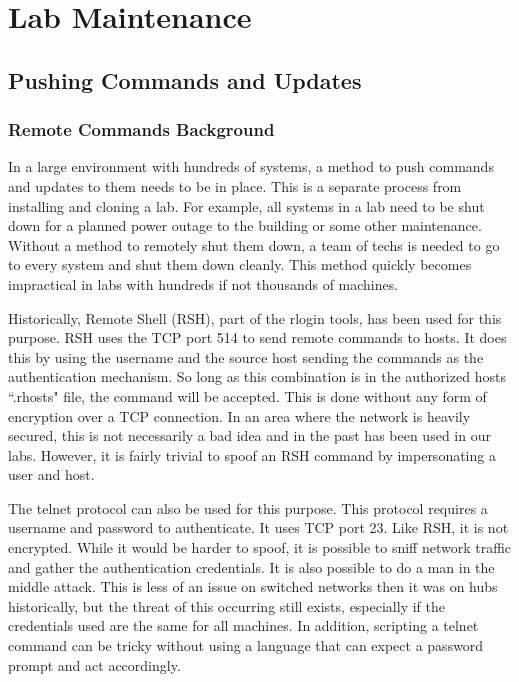 \chapter{Lab Maintenance} \label{ch:lab_maintenance}
\section{Pushing Commands and Updates} \label{sec:ssh_push}
\subsection{Remote Commands Background}
In a large environment with hundreds of systems, a method to push commands and updates to them needs to be in place.  This is a separate process from installing and cloning a lab.  For example, all systems in a lab need to be shut down for a planned power outage to the building or some other maintenance.  Without a method to remotely shut them down, a team of techs is needed to go to every system and shut them down cleanly.  This method quickly becomes impractical in labs with hundreds if not thousands of machines.  

Historically, Remote Shell (RSH), part of the rlogin tools, has been used for this purpose.  RSH uses the TCP port 514 to send remote commands to hosts.  It does this by using the username and the source host sending the commands as the authentication mechanism.  So long as this combination is in the authorized hosts ``.rhosts" file, the command will be accepted.  This is done without any form of encryption over a TCP connection.  In an area where the network is heavily secured, this is not necessarily a bad idea and in the past has been used in our labs.  However, it is fairly trivial to spoof an RSH command by impersonating a user and host.  

The telnet protocol can also be used for this purpose.  This protocol requires a username and password to authenticate.  It uses TCP port 23.  Like RSH, it is not encrypted.  While it would be harder to spoof, it is possible to sniff network traffic and gather the authentication credentials.  It is also possible to do a man in the middle attack.  This is less of an issue on switched networks then it was on hubs historically, but the threat of this occurring still exists, especially if the credentials used are the same for all machines.  In addition, scripting a telnet command can be tricky without using a language that can expect a password prompt and act accordingly.

